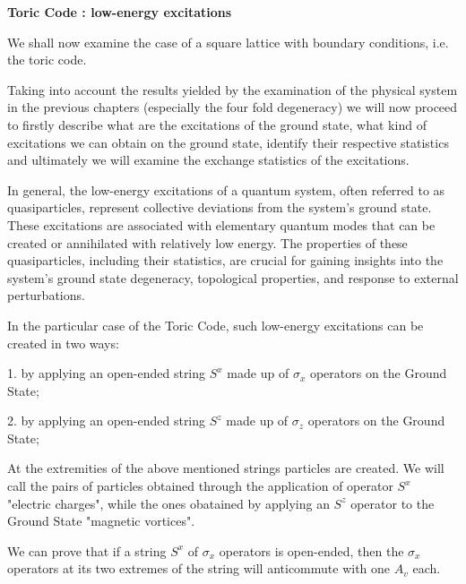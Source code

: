 \documentclass[12pt]{report}
\begin{document}
	\begin{minipage}{1 \textwidth}
		
		\textbf{Toric Code : low-energy excitations}\newline
		
		We shall now examine the case of a square lattice with boundary conditions, i.e. the toric code. \newline
		
		Taking into account the results yielded by the examination of the physical system in the previous chapters (especially the four fold degeneracy) we will now proceed to firstly describe what are the excitations of the ground state, what kind of excitations we can obtain on the ground state, identify their respective statistics and ultimately we will examine the exchange statistics of the excitations.\newline
		
		In general, the low-energy excitations of a quantum system, often referred to as quasiparticles, represent collective deviations from the system's ground state. These excitations are associated with elementary quantum modes that can be created or annihilated with relatively low energy. The properties of these quasiparticles, including their statistics, are crucial for gaining insights into the system's ground state degeneracy, topological properties, and response to external perturbations. \newline
		
		In the particular case of the Toric Code, such low-energy excitations can be created in two ways:  \newline
		
		1. by applying an open-ended string $S^x$ made up of $\sigma_x$ operators on the Ground State;\newline
		
		2. by applying an open-ended string $S^z$ made up of $\sigma_z$ operators on the Ground State;\newline
		
		At the extremities of the above mentioned strings particles are created. We will call the pairs of particles obtained through the application of operator $S^x$ "electric charges", while the ones obatained by applying an $S^z$ operator to the Ground State "magnetic vortices".\newline
		
		
		We can prove that if a string $S^x$ of $\sigma_x$ operators is open-ended, then the $\sigma_x$ operators at its two extremes of the string will anticommute with one $A_v$ each.\newline
		

\end{minipage}
\end{document}
